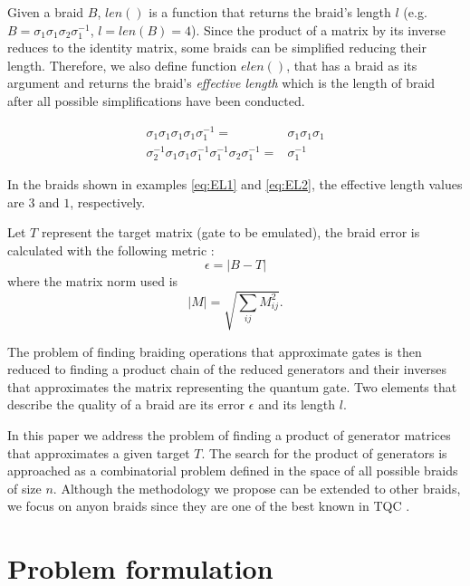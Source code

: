 Given a braid $B$, $len()$ is a function that  returns the braid's length $l$ (e.g. $B=\sigma_1 \sigma_1 \sigma_2 \sigma_1^{-1}$, $l=len(B)=4$). Since the product of a matrix by its inverse  reduces to the identity matrix, some braids can be simplified reducing their length. Therefore, we also define function $elen()$, that has a braid as its argument and returns the braid's \emph{effective length} which is the length of braid after all possible simplifications have been conducted.

\begin{align}
  \sigma_1 \sigma_1 \sigma_1 \sigma_1 \sigma_1^{-1} =&   \sigma_1 \sigma_1 \sigma_1 \label{eq:EL1} \\
  \sigma_2^{-1} \sigma_1 \sigma_1 \sigma_1^{-1} \sigma_1^{-1}  \sigma_2 \sigma_1^{-1} =& \sigma_1^{-1} \label{eq:EL2} 
\end{align}

 In the braids shown in examples \eqref{eq:EL1} and  \eqref{eq:EL2}, the effective length values are $3$ and $1$, respectively. 

Let $T$ represent the target matrix (gate to be emulated), the braid error is calculated with the following metric  \cite{Mcdonald_and_Katzgraber:2013}:
\begin{equation}
 \epsilon = |B-T| \label{eq:ERROR}
\end{equation}
where the matrix norm used is
\begin{equation}
 |M| = \sqrt{\sum_{ij}M_{ij}^2}.
\end{equation}

The problem of finding braiding operations that approximate gates is then reduced to finding a product chain of the reduced generators and their inverses that approximates the matrix representing the quantum gate. Two elements that describe the quality of a braid are its error $\epsilon$ and its length $l$. 




 In this paper we address the problem of finding a product of generator matrices that approximates a given target $T$. The search for the product of generators is approached as a combinatorial problem defined in the space of all possible braids of size $n$.  Although the methodology we propose can be extended to other braids, we focus on anyon braids since they are one of the best known in TQC \cite{Mcdonald_and_Katzgraber:2013,Xu_and_Xin:2008}.


\section{Problem formulation} \label{sec:PROBFORM}

